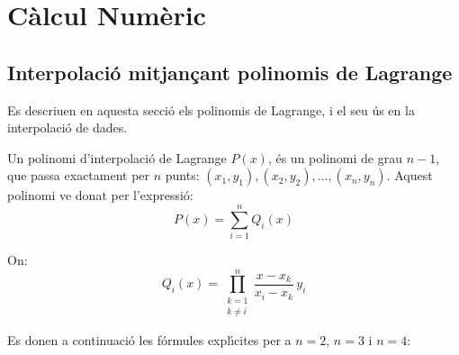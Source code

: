 \chapter{C\`{a}lcul Num\`{e}ric} 

\section{Interpolaci\'{o} mitjan\c{c}ant polinomis de Lagrange}

Es descriuen en aquesta secci\'{o} els polinomis de Lagrange, i el seu \'{u}s en la interpolaci\'{o} de dades.

Un polinomi d'interpolaci\'{o} de Lagrange $P(x)$, \'{e}s un polinomi de grau $n-1$, que passa exactament per $n$ punts:
$(x_1, y_1), (x_2, y_2), \dots, (x_n, y_n)$. Aquest polinomi ve donat per l'expressi\'{o}:
\begin{equation}
  P(x) = \sum_{i=1}^{n} Q_i(x)
\end{equation}

On:
\begin{equation}
  Q_i(x) = \prod_{\substack{k=1 \\ k\neq i}}^{n} \frac{x-x_k}{x_i-x_k}\, y_i
\end{equation}

Es donen a continuaci\'{o} les f\'{o}rmules expl\'{\i}cites per a $n = 2$, $n=3$ i $n=4$:

